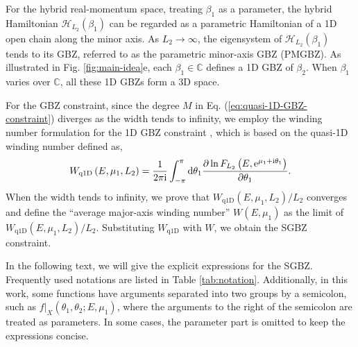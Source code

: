 \documentclass[pdflatex,sn-nature, iicol]{sn-jnl}%
\theoremstyle{thmstyleone}%
\theoremstyle{thmstyletwo}%
\theoremstyle{thmstylethree}%
\begin{document}
For the hybrid real-momentum space, treating $\beta_{1}$ as a parameter,
the hybrid Hamiltonian $\mathcal{H}_{L_{2}}(\beta_{1})$ can be regarded
as a parametric Hamiltonian of a 1D open chain along the minor axis.
As $L_{2}\rightarrow\infty$, the eigensystem of $\mathcal{H}_{L_{2}}(\beta_{1})$
tends to its GBZ, referred to as the parametric minor-axis GBZ (PMGBZ).
As illustrated in Fig. \ref{fig:main-idea}e, each $\beta_{1}\in\mathbb{C}$
defines a 1D GBZ of $\beta_{2}$. When $\beta_{1}$ varies over $\mathbb{C}$,
all these 1D GBZs form a 3D space.

For the GBZ constraint, since the degree $M$ in Eq. (\ref{eq:quasi-1D-GBZ-constraint})
diverges as the width tends to infinity, we employ the winding number
formulation for the 1D GBZ constraint \cite{zhangCorrespondenceWindingNumbers2020},
which is based on the quasi-1D winding number defined as, 
\begin{equation}
W_{\text{q1D}}\left(E,\mu_{1},L_{2}\right)=\frac{1}{2\pi\mathrm{i}}\int_{-\pi}^{\pi}\mathrm{d}\theta_{1}\frac{\partial\ln F_{L_{2}}\left(E,\mathrm{e}^{\mu_{1}+\mathrm{i}\theta_{1}}\right)}{\partial\theta_{1}}.\label{eq:definition-winding-number-quasi-1D}
\end{equation}
When the width tends to infinity, we prove that $W_{\text{q1D}}(E,\mu_{1},L_{2})/L_{2}$
converges and define the ``average major-axis winding number'' $W(E,\mu_{1})$
as the limit of $W_{\text{q1D}}(E,\mu_{1},L_{2})/L_{2}$. Substituting
$W_{\text{q1D}}$ with $W$, we obtain the SGBZ constraint.

In the following text, we will give the explicit expressions for the
SGBZ. Frequently used notations are listed in Table \ref{tab:notation}.
Additionally, in this work, some functions have arguments separated
into two groups by a semicolon, such as $f|_{X}(\theta_{1},\theta_{2};E,\mu_{1})$,
where the arguments to the right of the semicolon are treated as parameters.
In some cases, the parameter part is omitted to keep the expressions
concise.
\end{document}
